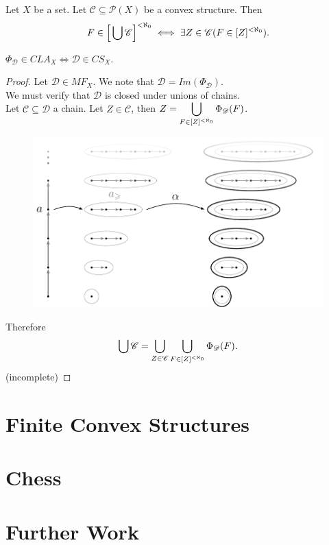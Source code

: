 \documentclass{amsart}
\begin{document}
\begin{lemma}
Let \(X\) be a set.
Let \(\mathscr{C} \subseteq \mathscr{P} (X)\) be a convex structure.
Then
\[
	F \in \Big[\displaystyle\bigcup \mathscr{C}\Big] ^ {< \aleph _0} \iff 
	\exists Z \in \mathscr{C} (F \in [Z]^ {< \aleph _0}).
\]
\end{lemma}

\begin{theorem}
\(\Phi _{\mathscr{D}} \in CLA_X \iff \mathscr{D} \in CS_X\).
\end{theorem}
\begin{proof}
Let \(\mathscr{D} \in MF_X\).
We note that \(\mathscr{D} = Im(\Phi _{\mathscr{D}})\). \\ 
We must verify that \(\mathscr{D}\) is closed under unions of chains. \\ 
Let \(\mathscr{C} \subseteq \mathscr{D}\) a chain. 
Let \(Z \in \mathscr{C}\), then 
\(Z = \displaystyle\bigcup_{F \in [Z]^ {< \aleph _0}} \Phi _{\mathscr{D}} (F)\). 
	\begin{figure}[hbtp!]
		\centering
		\includegraphics[width= 0.6 \linewidth, page = 1]{IMAGES/2/2}
	\end{figure}
\newpage %
Therefore
\[
	\displaystyle\bigcup \mathscr{C} =
	\displaystyle\bigcup_{Z \in \mathscr{C}} 
	\displaystyle\bigcup_{F \in [Z]^ {< \aleph _0}} \Phi _{\mathscr{D}} (F).
\]
(incomplete)
\end{proof}

\section{Finite Convex Structures} %

\section{Chess} %

\section{Further Work} %



\end{document}
